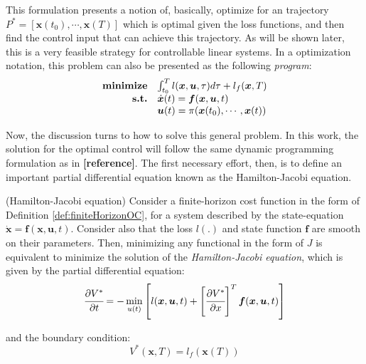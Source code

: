 \documentclass[a4paper,11pt]{book}
\numberwithin{figure}{chapter}
\numberwithin{equation}{chapter}
\numberwithin{table}{chapter}
\newtheorem{theorem}{Theorem}[chapter]
\theoremstyle{definition}
\newcounter{boxed-theorem}
\newenvironment{boxed-theorem}[1]
{\begin{shaded} \begin{theorem}{#1}}
{\end{theorem} \end{shaded}}
\newcounter{boxed-definition}
\begin{document}
This formulation presents a notion of, basically, optimize for an trajectory $P^* = [\bm{x}(t_0), \cdots, \bm{x}(T)]$ which is optimal given the loss functions, and then find the control input that can achieve this trajectory. As will be shown later, this is a very feasible strategy for controllable linear systems. In a optimization notation, this problem can also be presented as the following \textit{program}: 
\begin{align}
\begin{matrix*}[l]
	\textbf{minimize} & \int_{t_0}^T l(\bm{x}, \bm{u}, \tau) d \tau + l_f(\bm{x}, T) \\
	\hfill \textbf{s.t.} & \dot{\bm{x}}(t) = \bm{f}(\bm{x}, \bm{u}, t)  \\
				& \bm{u}(t) = \pi(\bm{x}(t_0), \cdots, \bm{x}(t))
\end{matrix*}
\end{align}

Now, the discussion turns to how to solve this general problem. In this work, the solution for the optimal control will follow the same dynamic programming formulation as in \textbf{[reference]}. The first necessary effort, then, is to define an important partial differential equation known as the Hamilton-Jacobi equation.

\begin{boxed-theorem}{(Hamilton-Jacobi equation)} \label{th:hamiltonJacobi}
	Consider a finite-horizon cost function in the form of Definition \ref{def:finiteHorizonOC}, for a system described by the state-equation $\dot{\bm{x}} = \bm{f}(\bm{x}, \bm{u}, t)$. Consider also that the loss $l(.)$ and state function $\bm{f}$ are smooth on their parameters. Then, minimizing any functional in the form of $J$ is equivalent to minimize the solution of the \textit{Hamilton-Jacobi equation}, which is given by the partial differential equation:
	\begin{equation} \label{eq:HJEquation}
		\cfrac{\partial V^*}{\partial t} = - \min_{u(t)} \left[ l(\bm{x}, \bm{u}, t) + \left[ \cfrac{\partial V^*}{\partial x} \right]^T \bm{f}(\bm{x}, \bm{u}, t)  \right]
	\end{equation}
	
	\noindent and the boundary condition:
	\begin{equation}
		V^*(\bm{x}, T) = l_f(\bm{x}(T))
	\end{equation}
\end{boxed-theorem}
\end{document}
